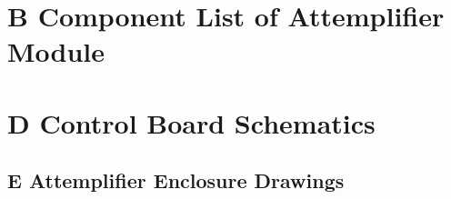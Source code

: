 \documentclass[12pt,a4paper,oneside]{article}
\begin{document}
\begin{landscape}
\section*{B \hspace{.5cm} Component List of Attemplifier Module}


\begin{table}[H]
\centering
{}
\label{tab:Attemp_components}
\end{table}


\section*{D \hspace{.5cm} Control Board Schematics}


%
%

\end{landscape}

\begin{landscape}
\section*{E \hspace{.5cm} Attemplifier Enclosure Drawings}


%
%
\end{landscape}
\end{document}
